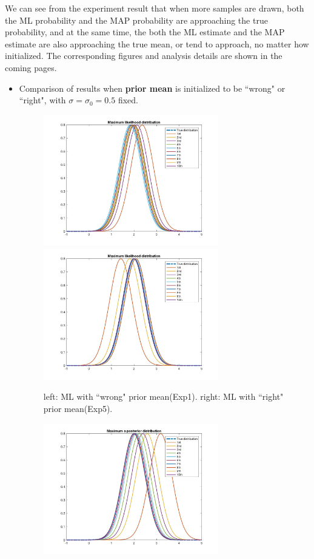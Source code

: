 \documentclass[a4paper]{article}
\begin{document}
\begin{spacing}{2.0}
We can see from the experiment result that when more samples are drawn, both the ML probability and the MAP probability are approaching the true probability, and at the same time, the both the ML estimate and the MAP estimate are also approaching the true mean, or tend to approach, no matter how initialized. 
The corresponding figures and analysis details are shown in the coming pages.
\begin{itemize}
\newpage
\item
Comparison of results when \textbf{prior mean} is initialized to be ``wrong" or ``right", with $\sigma = \sigma_0 = 0.5$ fixed.
\begin{figure}[H]
	\centering
	\includegraphics[width=3in]{ML1.jpg}
	\includegraphics[width=3in]{ML5.jpg}
	\caption{left: ML with ``wrong" prior mean(Exp1). right: ML with ``right" prior mean(Exp5).}
	\label{q}
\end{figure}
\begin{figure}[H]
	\centering
	\includegraphics[width=3in]{MAP1.jpg}

\end{figure}
\end{itemize}
\end{spacing}
\end{document}
